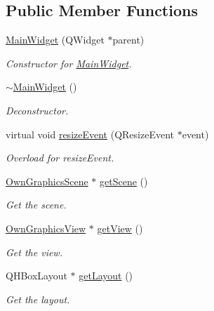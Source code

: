 \subsection*{Public Member Functions}
\begin{DoxyCompactItemize}
\item 
\mbox{\hyperlink{classMainWidget_a62f5aa5fe2314c6221ac49b328b72e8b}{Main\+Widget}} (Q\+Widget $\ast$parent)
\begin{DoxyCompactList}\small\item\em Constructor for \mbox{\hyperlink{classMainWidget}{Main\+Widget}}. \end{DoxyCompactList}\item 
\mbox{\label{classMainWidget_add21c63f8e799303a21a69da3d288c2f}} 
\mbox{\hyperlink{classMainWidget_add21c63f8e799303a21a69da3d288c2f}{$\sim$\+Main\+Widget}} ()
\begin{DoxyCompactList}\small\item\em Deconstructor. \end{DoxyCompactList}\item 
virtual void \mbox{\hyperlink{classMainWidget_a7f5a0d4e7d8ecaa1b284014f9dddb9c5}{resize\+Event}} (Q\+Resize\+Event $\ast$event)
\begin{DoxyCompactList}\small\item\em Overload for resize\+Event. \end{DoxyCompactList}\item 
\mbox{\hyperlink{classOwnGraphicsScene}{Own\+Graphics\+Scene}} $\ast$ \mbox{\hyperlink{classMainWidget_ad40a8bd13b501a0ebe88c87426a5b591}{get\+Scene}} ()
\begin{DoxyCompactList}\small\item\em Get the scene. \end{DoxyCompactList}\item 
\mbox{\hyperlink{classOwnGraphicsView}{Own\+Graphics\+View}} $\ast$ \mbox{\hyperlink{classMainWidget_ad23c8b31116d474ce1a19fe78ad6db07}{get\+View}} ()
\begin{DoxyCompactList}\small\item\em Get the view. \end{DoxyCompactList}\item 
Q\+H\+Box\+Layout $\ast$ \mbox{\hyperlink{classMainWidget_a639b465bb49eb31e1c09051ae047951f}{get\+Layout}} ()
\begin{DoxyCompactList}\small\item\em Get the layout. \end{DoxyCompactList}\item 

\end{DoxyCompactItemize}

